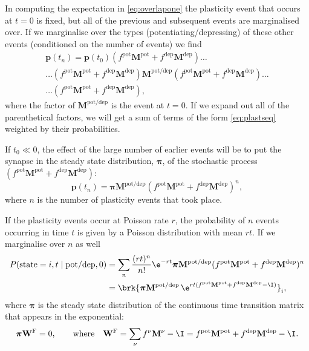 \documentclass[12pt]{article}
\newcommand{\prm}{p}
\newcommand{\pr}{\mathbf{\prm}}
\newcommand{\eqm}{\pi}
\newcommand{\eq}{\boldsymbol{\eqm}}
\newcommand{\Wm}{W}
\newcommand{\W}{\mathbf{\Wm}}
\newcommand{\MMdm}{M}
\newcommand{\MMd}{\mathbf{\MMdm}}
\newcommand{\frg}{\W^{\mathrm{F}}}
\newcommand{\pot}{^{\text{pot}}}
\newcommand{\dep}{^{\text{dep}}}
\newcommand{\potdep}{^{\text{pot/dep}}}
\begin{document}
In computing the expectation in \eqref{eq:overlapone} the plasticity event that occurs at \(t=0\) is fixed, but all of the previous and subsequent events are marginalised over.
If we marginalise over the types (potentiating/depressing) of these other events (conditioned on the number of events) we find
%
\begin{multline}\label{eq:plastseqtypes}
  \pr(t_n) = \pr(t_0) (f\pot \MMd \pot + f\dep \MMd \dep)  \ldots \\
    \ldots (f\pot \MMd \pot + f\dep \MMd \dep) 
     \MMd \potdep (f\pot \MMd \pot + f\dep \MMd \dep) \ldots \\
    \ldots (f\pot \MMd \pot + f\dep \MMd \dep),
\end{multline}
% 
where the factor of \( \MMd \potdep\) is the event at \(t=0\).
If we expand out all of the parenthetical factors, we will get a sum of terms of the form \eqref{eq:plastseq} weighted by their probabilities.

If \(t_0 \ll 0\), the effect of the large number of earlier events will be to put the synapse in the steady state distribution, \(\eq\), of the stochastic process \((f\pot \MMd \pot+f\dep \MMd \dep)\):
%
\begin{equation}\label{eq:plastseqeq}
  \pr(t_n) = \eq  \MMd \potdep (f\pot \MMd \pot+f\dep \MMd \dep)^n,
\end{equation}
%
where \(n\) is the number of plasticity events that took place.

If the plasticity events occur at Poisson rate \(r\), the probability of \(n\) events occurring in time \(t\) is given by a Poisson distribution with mean \(rt\).
If we marginalise over \(n\) as well
%
\begin{equation}\label{eq:plastseqav}
\begin{aligned}
  P(\text{state}=i,t \mid \text{pot/dep},0)
    &= \sum_n \frac{(rt)^n}{n!} \e^{-rt} \eq  \MMd \potdep (f\pot \MMd \pot+f\dep \MMd \dep)^n \\
    &= \brk{ \eq  \MMd \potdep\, \e^{rt(f\pot \MMd \pot+f\dep \MMd \dep-\I) } }_i,
\end{aligned}
\end{equation}
%
where \(\eq\) is the steady state distribution of the continuous time transition matrix that appears in the exponential:
%
\begin{equation}\label{eq:eq}
  \eq\frg = 0,
  \qquad\text{where}\quad
  \frg = \sum_\nu f^\nu \MMd^\nu - \I
    = f\pot \MMd \pot + f\dep \MMd \dep - \I.
\end{equation}
%
\end{document}
